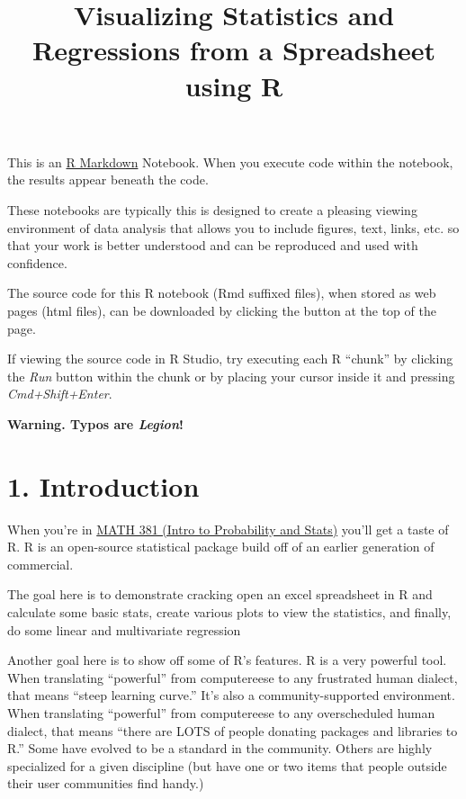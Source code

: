 \documentclass[]{article}
\title{Visualizing Statistics and Regressions from a Spreadsheet using R}
\author{}
\date{}
\begin{document}
\maketitle

This is an \href{http://rmarkdown.rstudio.com}{R Markdown} Notebook.
When you execute code within the notebook, the results appear beneath
the code.

These notebooks are typically this is designed to create a pleasing
viewing environment of data analysis that allows you to include figures,
text, links, etc. so that your work is better understood and can be
reproduced and used with confidence.

The source code for this R notebook (Rmd suffixed files), when stored as
web pages (html files), can be downloaded by clicking the button at the
top of the page.

If viewing the source code in R Studio, try executing each R ``chunk''
by clicking the \emph{Run} button within the chunk or by placing your
cursor inside it and pressing \emph{Cmd+Shift+Enter}.

\textbf{Warning. Typos are \emph{Legion}!}

\hypertarget{introduction}{%
\section{1. Introduction}\label{introduction}}

When you're in
\href{http://ecatalog.sdsmt.edu/preview_course_nopop.php?catoid=17\&coid=26571}{MATH
381 (Intro to Probability and Stats)} you'll get a taste of R. R is an
open-source statistical package build off of an earlier generation of
commercial.

The goal here is to demonstrate cracking open an excel spreadsheet in R
and calculate some basic stats, create various plots to view the
statistics, and finally, do some linear and multivariate regression

Another goal here is to show off some of R's features. R is a very
powerful tool. When translating ``powerful'' from computereese to any
frustrated human dialect, that means ``steep learning curve.'' It's also
a community-supported environment. When translating ``powerful'' from
computereese to any overscheduled human dialect, that means ``there are
LOTS of people donating packages and libraries to R.'' Some have evolved
to be a standard in the community. Others are highly specialized for a
given discipline (but have one or two items that people outside their
user communities find handy.)
\end{document}
